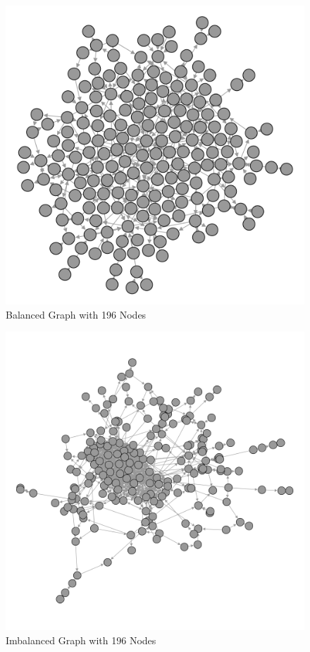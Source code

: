\documentclass[]{report}
\begin{document}
\begin{figure}
\label{img:ex-noncrunch}
\begin{center}
\includegraphics[scale=0.25]{non-crunch.png}
\end{center}
\caption{Balanced Graph with 196 Nodes}
\end{figure}
\begin{figure}
\label{img:ex-crunch}
\begin{center}
\includegraphics[scale=0.25]{crunched.png}
\end{center}
\caption{Imbalanced Graph with 196 Nodes}
\end{figure}
\end{document}
